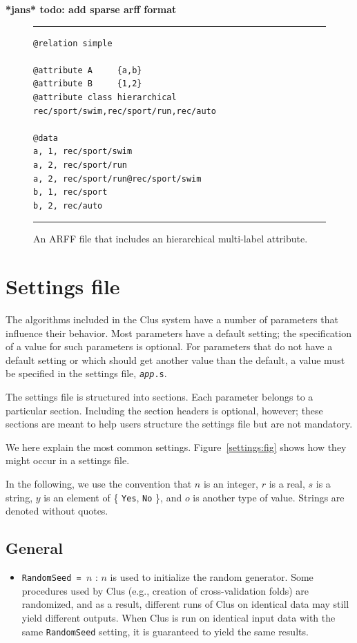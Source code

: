 \documentclass[a4paper]{report}
\begin{document}
\textbf{*jans* todo: add sparse arff format}


\begin{figure}
\hrule
\begin{verbatim}
@relation simple

@attribute A     {a,b}
@attribute B     {1,2}
@attribute class hierarchical rec/sport/swim,rec/sport/run,rec/auto

@data
a, 1, rec/sport/swim
a, 2, rec/sport/run
a, 2, rec/sport/run@rec/sport/swim
b, 1, rec/sport
b, 2, rec/auto
\end{verbatim}
\hrule
\caption{An ARFF file that includes an hierarchical multi-label attribute.}
\label{arffhmc:fig}
\end{figure}

\chapter{Settings file}

The algorithms included in the Clus system have a number of parameters that influence their behavior.  Most parameters have a default setting; the specification of a value for such parameters is optional.  For parameters that do not have a default setting or which should get another value than the default, a value must be specified in the settings file, {\tt {\em app}.s}.

The settings file is structured into sections.  Each parameter belongs to a particular section.  Including the section headers is optional, however; these sections are meant to help users structure the settings file but are not mandatory.

We here explain the most common settings.  Figure~\ref{settings:fig} shows how they might occur in a settings file.

In the following, we use the convention that $n$ is an integer, $r$ is a real, $s$ is a string, $y$ is an element of \{ {\tt Yes}, {\tt No} \}, and $o$ is another type of value.  Strings are denoted without quotes.

\section{General}

\begin{itemize}
\item {\tt RandomSeed = $n$} : $n$ is used to initialize the random generator.
Some procedures used by Clus (e.g., creation of cross-validation folds) are randomized, and as a result, different runs of Clus on identical data may still yield different outputs.  When Clus is run on identical input data with the same {\tt RandomSeed} setting, it is guaranteed to yield the same results.
\end{itemize}
\end{document}
